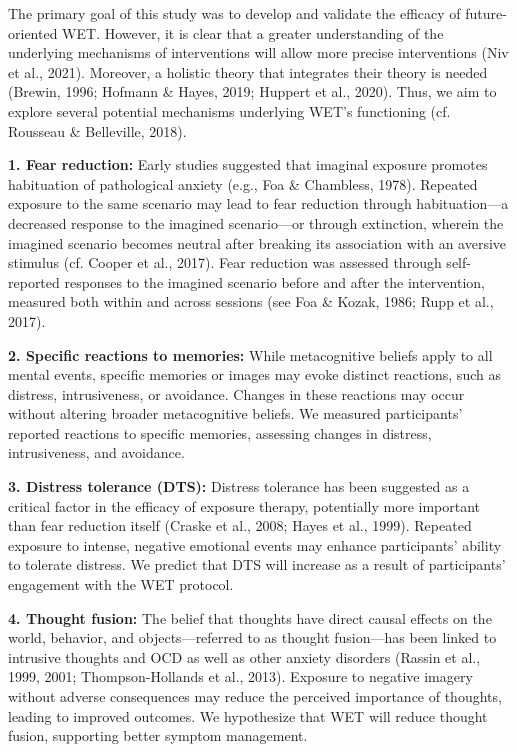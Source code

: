 \documentclass[
  man,floatsintext]{apa7}
\begin{document}
The primary goal of this study was to develop and validate the efficacy of future-oriented WET.
However, it is clear that a greater understanding of the underlying mechanisms of interventions will allow more precise interventions (Niv et al., 2021).
Moreover, a holistic theory that integrates their theory is needed (Brewin, 1996; Hofmann \& Hayes, 2019; Huppert et al., 2020).
Thus, we aim to explore several potential mechanisms underlying WET's functioning (cf. Rousseau \& Belleville, 2018).

\textbf{1. Fear reduction:}
Early studies suggested that imaginal exposure promotes habituation of pathological anxiety (e.g., Foa \& Chambless, 1978).
Repeated exposure to the same scenario may lead to fear reduction through habituation---a decreased response to the imagined scenario---or through extinction, wherein the imagined scenario becomes neutral after breaking its association with an aversive stimulus (cf. Cooper et al., 2017).
Fear reduction was assessed through self-reported responses to the imagined scenario before and after the intervention, measured both within and across sessions (see Foa \& Kozak, 1986; Rupp et al., 2017).

\textbf{2. Specific reactions to memories:}
While metacognitive beliefs apply to all mental events, specific memories or images may evoke distinct reactions, such as distress, intrusiveness, or avoidance.
Changes in these reactions may occur without altering broader metacognitive beliefs.
We measured participants' reported reactions to specific memories, assessing changes in distress, intrusiveness, and avoidance.

\textbf{3. Distress tolerance (DTS):}
Distress tolerance has been suggested as a critical factor in the efficacy of exposure therapy, potentially more important than fear reduction itself (Craske et al., 2008; Hayes et al., 1999).
Repeated exposure to intense, negative emotional events may enhance participants' ability to tolerate distress.
We predict that DTS will increase as a result of participants' engagement with the WET protocol.

\textbf{4. Thought fusion:}
The belief that thoughts have direct causal effects on the world, behavior, and objects---referred to as thought fusion---has been linked to intrusive thoughts and OCD as well as other anxiety disorders (Rassin et al., 1999, 2001; Thompson-Hollands et al., 2013).
Exposure to negative imagery without adverse consequences may reduce the perceived importance of thoughts, leading to improved outcomes.
We hypothesize that WET will reduce thought fusion, supporting better symptom management.
\end{document}
